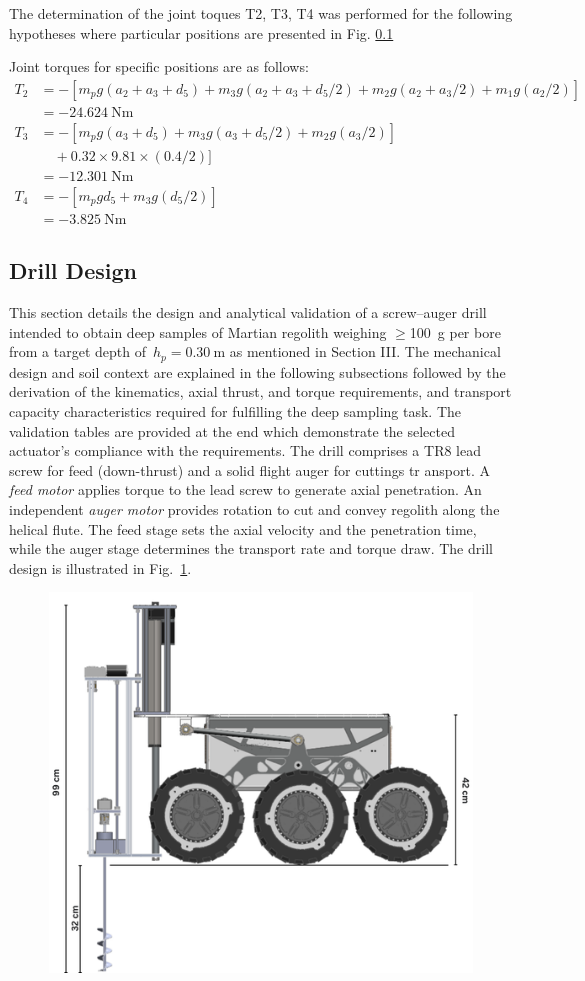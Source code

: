 \documentclass[letterpaper, 10 pt, conference]{ieeeconf}  %
\begin{document}
The determination of the joint toques T2, T3, T4 was performed for the following hypotheses where particular positions are presented in Fig. \ref{}


Joint torques for specific positions are as follows:
\begin{align*}
T_2  &= -[m_p g (a_2+a_3+d_5) + m_3 g (a_2+a_3+d_5/2) + m_2 g (a_2+a_3/2) + m_1 g (a_2/2)] \\
&= -24.624\ \mathrm{Nm} \\[1.5em]
T_3  &= -[ m_p g (a_3 + d_5) + m_3 g (a_3 + d_5/2) + m_2 g (a_3/2) ] \\
&\quad + 0.32 \times 9.81 \times (0.4/2) ] \\
&= -12.301\ \mathrm{Nm} \\[1.5em]
T_4  &= -[ m_p g d_5 + m_3 g (d_5/2) ] \\
&= -3.825\ \mathrm{Nm}
\end{align*}


\subsection{Drill Design}
This section details the design and analytical validation of a screw–auger drill intended to obtain deep samples of Martian regolith weighing \(\ge\)100~g per bore from a target depth of \(\,h_p=0.30~\mathrm{m}\) as mentioned in Section III. The mechanical design and soil context are explained in the following subsections followed by the derivation of the kinematics, axial thrust, and torque requirements, and transport capacity characteristics required for fulfilling the deep sampling task. The validation tables are provided at the end which demonstrate the selected actuator's compliance with the requirements. The drill comprises a TR8 lead screw for feed (down-thrust) and a solid flight auger for cuttings tr ansport. A  \emph{feed motor} applies torque to the lead screw to generate axial penetration. An independent \emph{auger motor} provides rotation to cut and convey regolith along the helical flute. The feed stage sets the axial velocity and the penetration time, while the auger stage determines the transport rate and torque draw. The drill design is illustrated in Fig.~\ref{drill}.
\begin{figure}[h!]
    \centering
    \includegraphics[width=0.75\linewidth]{drillcalc.png}
    \caption{}
    \label{drill}
\end{figure}
\end{document}
